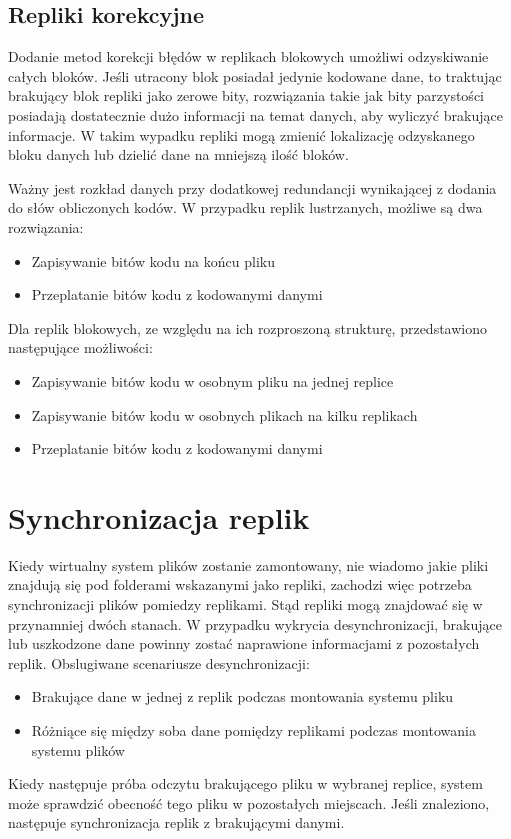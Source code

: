 \subsection{Repliki korekcyjne}
Dodanie metod korekcji błędów w replikach blokowych umożliwi odzyskiwanie całych bloków. Jeśli utracony blok posiadał jedynie kodowane dane, to traktując brakujący blok repliki jako zerowe bity, rozwiązania takie jak bity parzystości posiadają dostatecznie dużo informacji na temat danych, aby wyliczyć brakujące informacje. W takim wypadku repliki mogą zmienić lokalizację odzyskanego bloku danych lub dzielić dane na mniejszą ilość bloków. 

Ważny jest rozkład danych przy dodatkowej redundancji wynikającej z dodania do słów obliczonych kodów. W przypadku replik lustrzanych, możliwe są dwa rozwiązania:
\begin{itemize}
        \item Zapisywanie bitów kodu na końcu pliku
        \item Przeplatanie bitów kodu z kodowanymi danymi
\end{itemize}
Dla replik blokowych, ze względu na ich rozproszoną strukturę, przedstawiono następujące możliwości:
\begin{itemize}
        \item Zapisywanie bitów kodu w osobnym pliku na jednej replice
        \item Zapisywanie bitów kodu w osobnych plikach na kilku replikach
        \item Przeplatanie bitów kodu z kodowanymi danymi
\end{itemize}

\section {Synchronizacja replik}
Kiedy wirtualny system plików zostanie zamontowany, nie wiadomo jakie pliki znajdują się pod folderami wskazanymi jako repliki, zachodzi więc potrzeba synchronizacji plików pomiedzy replikami. Stąd repliki mogą znajdować się w przynamniej dwóch stanach. W przypadku wykrycia desynchronizacji, brakujące lub uszkodzone dane powinny zostać naprawione informacjami z pozostałych replik. Obslugiwane scenariusze desynchronizacji:
\begin{itemize}
    \item Brakujące dane w jednej z replik podczas montowania systemu pliku
    \item Różniące się między soba dane pomiędzy replikami podczas montowania systemu plików
\end{itemize}
Kiedy następuje próba odczytu brakującego pliku w wybranej replice, system może sprawdzić obecność tego pliku w pozostałych miejscach. Jeśli znaleziono, następuje synchronizacja replik z brakującymi danymi. 

